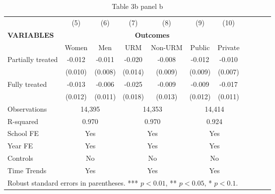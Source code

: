 \documentclass{article}
\begin{document}
\begin{table}[htbp]
\centering
\caption{Table 3b panel b}
\begin{tabular}{lcccccccccc}
\toprule
 & (5) & (6) & (7) & (8) & (9) & (10) \\
\cmidrule(lr){2-7}
\textbf{VARIABLES} & \multicolumn{6}{c}{\textbf{Outcomes}} \\
\cmidrule(lr){2-7}
 & Women & Men & URM & Non-URM & Public & Private \\
\midrule
Partially treated & -0.012 & -0.011 & -0.020 & -0.008 & -0.012 & -0.010 \\
 & (0.010) & (0.008) & (0.014) & (0.009) & (0.009) & (0.007) \\
Fully treated & -0.013 & -0.006 & -0.025 & -0.009 & -0.009 & -0.017 \\
 & (0.012) & (0.011) & (0.018) & (0.013) & (0.012) & (0.011) \\
\midrule
Observations & \multicolumn{2}{c}{14,395} & \multicolumn{2}{c}{14,353} & \multicolumn{2}{c}{14,414} \\
R-squared & \multicolumn{2}{c}{0.970} & \multicolumn{2}{c}{0.970} & \multicolumn{2}{c}{0.924} \\
\midrule
School FE & \multicolumn{2}{c}{Yes} & \multicolumn{2}{c}{Yes} & \multicolumn{2}{c}{Yes} \\
Year FE & \multicolumn{2}{c}{Yes} & \multicolumn{2}{c}{Yes} & \multicolumn{2}{c}{Yes} \\
Controls & \multicolumn{2}{c}{No} & \multicolumn{2}{c}{No} & \multicolumn{2}{c}{No} \\
Time Trends & \multicolumn{2}{c}{Yes} & \multicolumn{2}{c}{Yes} & \multicolumn{2}{c}{Yes} \\
\bottomrule
\multicolumn{7}{l}{\footnotesize Robust standard errors in parentheses. *** $p<0.01$, ** $p<0.05$, * $p<0.1$.}
\end{tabular}
\end{table}
\end{document}

